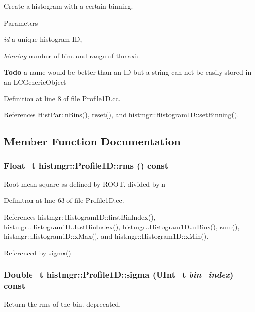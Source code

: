 Create a histogram with a certain binning. 
\begin{DoxyParams}{Parameters}
\item[{\em id}]a unique histogram ID, \item[{\em binning}]number of bins and range of the axis \end{DoxyParams}
\begin{Desc}
\item[{\bf Todo}]a name would be better than an ID but a string can not be easily stored in an LCGenericObject \end{Desc}


Definition at line 8 of file Profile1D.cc.

References HistPar::nBins(), reset(), and histmgr::Histogram1D::setBinning().

\subsection{Member Function Documentation}
\subsubsection[{rms}]{\setlength{\rightskip}{0pt plus 5cm}Float\_\-t histmgr::Profile1D::rms () const}\label{classhistmgr_1_1Profile1D_a79200e6ccc8ce76412dfcd9655319605}


Root mean square as defined by ROOT. divided by n 

Definition at line 63 of file Profile1D.cc.

References histmgr::Histogram1D::firstBinIndex(), histmgr::Histogram1D::lastBinIndex(), histmgr::Histogram1D::nBins(), sum(), histmgr::Histogram1D::xMax(), and histmgr::Histogram1D::xMin().

Referenced by sigma().
\subsubsection[{sigma}]{\setlength{\rightskip}{0pt plus 5cm}Double\_\-t histmgr::Profile1D::sigma (UInt\_\-t {\em bin\_\-index}) const\hspace{0.3cm}{\ttfamily  [inline]}}\label{classhistmgr_1_1Profile1D_acfc518a1e2e4bb73ab7e696eafd1c12a}


Return the rms of the bin. deprecated. 

